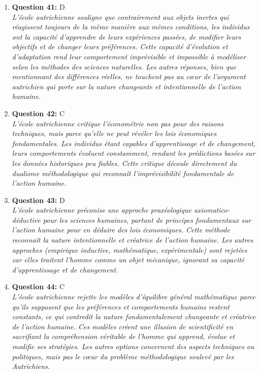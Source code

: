 \documentclass[12pt,a4paper]{article}
\begin{document}
\begin{enumerate}
\item \textbf{Question 41:} D
\\ \textit{L'école autrichienne souligne que contrairement aux objets inertes qui réagissent toujours de la même manière aux mêmes conditions, les individus ont la capacité d'apprendre de leurs expériences passées, de modifier leurs objectifs et de changer leurs préférences. Cette capacité d'évolution et d'adaptation rend leur comportement imprévisible et impossible à modéliser selon les méthodes des sciences naturelles. Les autres réponses, bien que mentionnant des différences réelles, ne touchent pas au cœur de l'argument autrichien qui porte sur la nature changeante et intentionnelle de l'action humaine.}

\item \textbf{Question 42:} C
\\ \textit{L'école autrichienne critique l'économétrie non pas pour des raisons techniques, mais parce qu'elle ne peut révéler les lois économiques fondamentales. Les individus étant capables d'apprentissage et de changement, leurs comportements évoluent constamment, rendant les prédictions basées sur les données historiques peu fiables. Cette critique découle directement du dualisme méthodologique qui reconnaît l'imprévisibilité fondamentale de l'action humaine.}

\item \textbf{Question 43:} D
\\ \textit{L'école autrichienne préconise une approche praxéologique axiomatico-déductive pour les sciences humaines, partant de principes fondamentaux sur l'action humaine pour en déduire des lois économiques. Cette méthode reconnaît la nature intentionnelle et créatrice de l'action humaine. Les autres approches (empirique inductive, mathématique, expérimentale) sont rejetées car elles traitent l'homme comme un objet mécanique, ignorant sa capacité d'apprentissage et de changement.}

\item \textbf{Question 44:} C
\\ \textit{L'école autrichienne rejette les modèles d'équilibre général mathématique parce qu'ils supposent que les préférences et comportements humains restent constants, ce qui contredit la nature fondamentalement changeante et créatrice de l'action humaine. Ces modèles créent une illusion de scientificité en sacrifiant la compréhension véritable de l'homme qui apprend, évolue et modifie ses stratégies. Les autres options concernent des aspects techniques ou politiques, mais pas le cœur du problème méthodologique soulevé par les Autrichiens.}


\end{enumerate}
\end{document}

